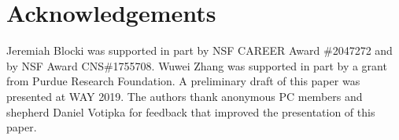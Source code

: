 \section{Acknowledgements}
Jeremiah Blocki was supported in part by NSF CAREER Award \#2047272 and by NSF Award CNS\#1755708. Wuwei Zhang was supported in part by a grant from Purdue Research Foundation. A preliminary draft of this paper was presented at WAY 2019. The authors thank anonymous PC members and shepherd Daniel Votipka for feedback that improved the presentation of this paper. 
